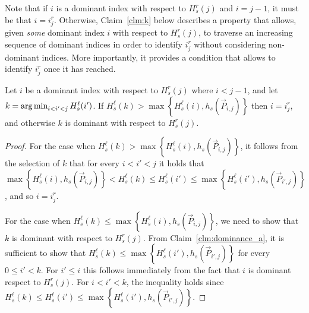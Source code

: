 Note that if $i$ is a dominant index with respect to $H^r_s(j)$ and $i = j-1$, it must be that $i = i^r_j$. Otherwise, Claim~\ref{clm:k} below describes a property that allows, given \emph{some} dominant index $i$ with respect to $H^r_s(j)$, to traverse an increasing sequence of dominant indices in order to identify $i^r_j$ without considering non-dominant indices. More importantly, it provides a condition that allows to identify $i^r_j$ once it has reached.


\begin{claim}
	\label{clm:k}
	Let $i$ be a dominant index with respect to $H^r_s(j)$ where $i < j-1$, and let $k = \operatorname*{arg\,min}_{i < i' < j} H^\ell_s(i')$. 
	If $H^\ell_s(k) > \max\left\{H^\ell_s(i), h_s(\vec{P}_{i, j})\right\}$ then $i = i^r_j$, and otherwise $k$ is dominant with respect to $H^r_s(j)$.
\end{claim}

\begin{proof}
	For the case when $H^\ell_s(k) > \max\left\{H^\ell_s(i), h_s(\vec{P}_{i, j})\right\}$, it follows from the selection of $k$ that for every $i < i' < j$ it holds that $\max\left\{H^\ell_s(i), h_s(\vec{P}_{i, j})\right\} < H^\ell_s(k) \leq H^\ell_s(i') \leq \max\left\{H^\ell_s(i'), h_s(\vec{P}_{i', j})\right\}$, and so $i = i^r_j$.
	
	For the case when $H^\ell_s(k) \leq \max\left\{H^\ell_s(i), h_s(\vec{P}_{i, j})\right\}$, we need to show that $k$ is dominant with respect to $H^r_s(j)$. From Claim~\ref{clm:dominance_a}, it is sufficient to show that $H^\ell_s(k) \leq \max\left\{H^\ell_s(i'), h_s(\vec{P}_{i', j})\right\}$ for every $0 \leq i' < k$. For $i' \leq i$ this follows immediately from the fact that $i$ is dominant respect to $H^r_s(j)$. For $i < i' < k$, the inequality holds since $H^\ell_s(k) \leq H^\ell_s(i') \leq \max\left\{H^\ell_s(i'), h_s(\vec{P}_{i', j})\right\}$.
\end{proof}

